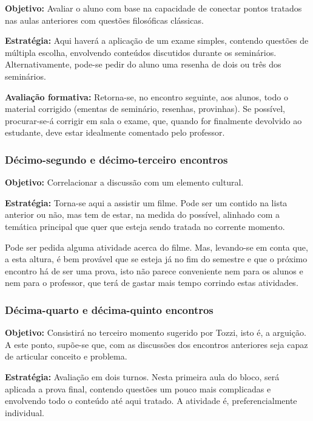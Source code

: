 \documentclass[12pt,a4paper]{article}
\begin{document}
	\textbf{Objetivo:} Avaliar o aluno com base na capacidade de 
	conectar pontos tratados nas aulas anteriores com questões 
	filosóficas clássicas. 

	\textbf{Estratégia:}
	Aqui haverá a aplicação de um exame simples, contendo questões 
	de múltipla escolha, envolvendo conteúdos discutidos durante os 
	seminários. Alternativamente, pode-se pedir do aluno uma resenha 
	de dois ou três dos seminários. 
	
	\textbf{Avaliação formativa:}
	Retorna-se, no encontro seguinte, aos alunos, todo o material 
	corrigido (ementas de seminário, resenhas, provinhas). Se possível, 
	procurar-se-á corrigir em sala o exame, que, quando for finalmente 
	devolvido ao estudante, deve estar idealmente comentado 
	pelo professor. 
	
	\subsubsection{Décimo-segundo e décimo-terceiro encontros}

	\textbf{Objetivo:} Correlacionar a discussão com um elemento cultural. 

	\textbf{Estratégia:}
	Torna-se aqui a assistir um filme. Pode ser um contido na 
	lista anterior ou não, mas tem de estar, na medida do possível, 
	alinhado com a temática principal que quer que esteja sendo 
	tratada no corrente momento. 
	
	Pode ser pedida alguma atividade acerca do filme. Mas, 
	levando-se em conta que, a esta altura, é bem provável que se esteja 
	já no fim do semestre e que o próximo encontro há de ser uma prova, 
	isto não parece conveniente nem para os alunos e nem para o professor, 
	que terá de gastar mais tempo corrindo estas atividades. 
	
	\subsubsection{Décima-quarto e décima-quinto encontros}
	
	\textbf{Objetivo:} Consistirá no terceiro momento sugerido por Tozzi, 
	isto é, a arguição. A este ponto, supõe-se que, com as discussões dos 
	encontros anteriores seja capaz de articular conceito e problema. 

	\textbf{Estratégia:}
	Avaliação em dois turnos. Nesta primeira aula do bloco, será aplicada 
	a prova final, contendo questões um pouco mais complicadas e 
	envolvendo todo o conteúdo até aqui tratado. A atividade é, 
	preferencialmente individual. 
	
\end{document}
